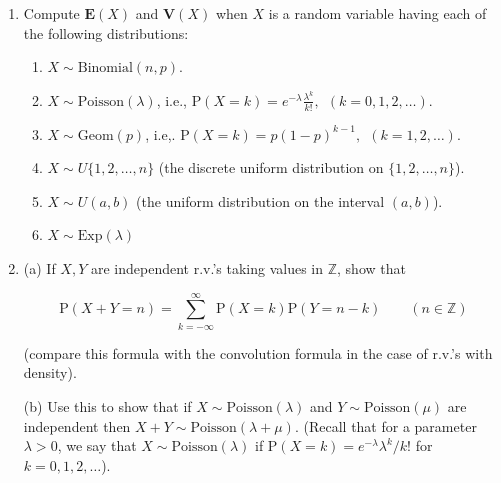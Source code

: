 \documentclass[11pt]{report}
\newcommand{\Z}{\mathbb{Z}}
\theoremstyle{plain}
\theoremstyle{definition}
\begin{document}
\begin{enumerate}[label=\arabic*.]
(b) Define

\[
R_n = \sum_{k=1}^n 1_{A_k} = \#\{ 1\le k\le n: k\textrm{ is a record time} \}, \qquad (n=1,2,\ldots).
\]

\noindent Compute $\mathbf{E}(R_n)$ and $\mathbf{V}(R_n)$.
Deduce that if $(m_n)_{n=1}^\infty$ is a sequence of
positive numbers such that $m_n \uparrow \infty$,
however slowly, then the number $R_n$ of record times
up to time $n$ satisfies

\[
\mathrm{P}\left(|R_n - \log n|>m_n \sqrt{\log n}\right) \xrightarrow[n\to\infty]{} 0.
\]

\item Compute $\mathbf{E}(X)$ and $\mathbf{V}(X)$ when $X$
is a random variable having each of the following
distributions:

\begin{enumerate}[label=\arabic*.]
\item $X \sim \textrm{Binomial}(n,p)$.

\item $X \sim \textrm{Poisson}(\lambda)$, i.e.,
$\mathrm{P}(X=k)=e^{-\lambda} \frac{\lambda^k}{k!}, \
\ (k=0,1,2,\ldots)$.

\item $X \sim \textrm{Geom}(p)$, i.e,.
$\mathrm{P}(X=k)=p(1-p)^{k-1}, \ \ (k=1,2,\ldots)$.

\item $X \sim U\{1,2,\ldots,n\}$ (the discrete uniform
distribution on $\{1,2,\ldots,n\}$).

\item $X \sim U(a,b)$ (the uniform distribution on the
interval $(a,b)$).

\item $X \sim \textrm{Exp}(\lambda)$
\end{enumerate}

\item (a) If $X,Y$ are independent r.v.'s taking values in
$\Z$, show that

\[
\mathrm{P}(X+Y = n) = \sum_{k=-\infty}^\infty \mathrm{P}(X=k) \mathrm{P}(Y=n-k) \qquad(n\in\Z)
\]

\noindent (compare this formula with the convolution formula in
the case of r.v.'s with density).

(b) Use this to show that if
$X\sim \textrm{Poisson}(\lambda)$ and
$Y\sim \textrm{Poisson}(\mu)$ are independent then
$X+Y \sim \textrm{Poisson}(\lambda+\mu)$. (Recall
that for a parameter $\lambda>0$, we say that
$X\sim \textrm{Poisson}(\lambda)$ if
$\mathrm{P}(X=k)=e^{-\lambda} \lambda^k/k!$ for
$k=0,1,2,\ldots$).


\end{enumerate}
\end{document}
